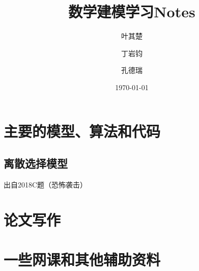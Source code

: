 \documentclass[11pt,a4paper]{article}
\title{数学建模学习Notes}
\author{叶其楚}
\author{丁岩钧}
\author{孔德瑞}
\date{\today}
\begin{document}
\newpage
\section{主要的模型、算法和代码}
\subsection{离散选择模型}
出自2018C题（恐怖袭击）

\newpage
\section{论文写作}

\newpage
\section{一些网课和其他辅助资料}
\end{document}
